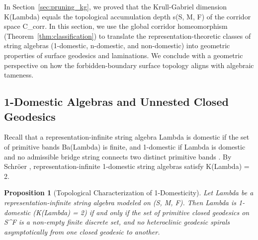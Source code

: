 \documentclass[11pt,a4paper,reqno]{amsart}
\def\({}%
\def\){}%
\def\mathcal#1{#1}%
\def\mathrm#1{#1}%
\def\operatorname#1{#1}%
\def\forb{F}%
\def\KG{K}%
\def\stgeo{s}%
\def\Lambda{Lambda}%
\def\emph#1{#1}%
\newtheorem{proposition}[theorem]{Proposition}
\theoremstyle{definition}
\theoremstyle{remark}
\newcommand{\KG}{\operatorname{KG}}
\newcommand{\forb}{\mathfrak{F}}
\newcommand{\stgeo}{\operatorname{st}_{\mathrm{geo}}}
\begin{document}
In Section~\ref{sec:pruning_kg}, we proved that the Krull-Gabriel dimension \(\KG(\Lambda)\) equals the topological accumulation depth \(\stgeo(\mathcal{S}, \mathcal{M}, \forb)\) of the corridor space \(\mathcal{C}_{\mathrm{corr}}\). In this section, we use the global corridor homeomorphism (Theorem~\ref{thm:classification}) to translate the representation-theoretic classes of string algebras (\(1\)-domestic, \(n\)-domestic, and non-domestic) into geometric properties of surface geodesics and laminations. We conclude with a geometric perspective on how the forbidden-boundary surface topology aligns with algebraic tameness.

\subsection{\(1\)-Domestic Algebras and Unnested Closed Geodesics}
\label{subsec:1_domestic}

Recall that a representation-infinite string algebra \(\Lambda\) is \emph{domestic} if the set of primitive bands \(\operatorname{Ba}(\Lambda)\) is finite, and \emph{\(1\)-domestic} if \(\Lambda\) is domestic and no admissible bridge string connects two distinct primitive bands \cite{Schroer2000b}. By Schr\"oer \cite{Schroer2000b}, representation-infinite \(1\)-domestic string algebras satisfy \(\KG(\Lambda) = 2\).

\begin{proposition}[Topological Characterization of \(1\)-Domesticity]
\label{prop:1_domestic}
Let \(\Lambda\) be a representation-infinite string algebra modeled on \((\mathcal{S}, \mathcal{M}, \forb)\). Then \(\Lambda\) is \(1\)-domestic (\(\KG(\Lambda) = 2\)) if and only if the set of primitive closed geodesics on \(\mathcal{S}^\circ \setminus \forb\) is a non-empty finite discrete set, and no heteroclinic geodesic spirals asymptotically from one closed geodesic to another.
\end{proposition}
\end{document}
